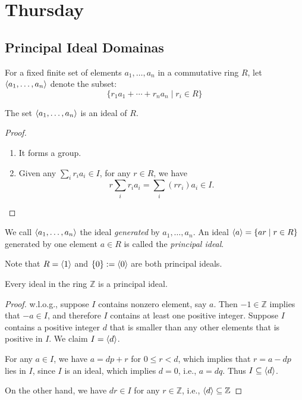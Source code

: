 \section{Thursday}



\subsection{Principal Ideal Domainas}
For a fixed finite set of elements $a_1,\dots,a_n$ in a commutative ring $R$, let $\langle a_1,\dots,a_n\rangle$ denote the subset:
\[
\{r_1a_1+\cdots+r_na_n\mid r_i\in R\}
\]
\begin{proposition}
The set $\langle a_1,\dots,a_n\rangle$ is an ideal of $R$.
\end{proposition}
\begin{proof}
\begin{enumerate}
\item
It forms a group.
\item
Given any $\sum_ir_ia_i\in I$, for any $r\in R$, we have
\[
r\sum_{i}r_ia_i=\sum_i(rr_i)a_i\in I.
\]
\end{enumerate}
\end{proof}
\begin{definition}
We call $\langle a_1,\dots,a_n\rangle$ the ideal \emph{generated} by $a_1,\dots,a_n$. An ideal $\langle a\rangle=\{ar\mid r\in R\}$ generated by one element $a\in R$ is called the \emph{principal ideal}.
\end{definition}
\begin{remark}
Note that $R=\langle 1\rangle$ and $\{0\}:=\langle 0\rangle$ are both principal ideals.
\end{remark}
\begin{theorem}
Every ideal in the ring $\mathbb{Z}$ is a principal ideal.
\end{theorem}
\begin{proof}
w.l.o.g., suppose $I$ contains nonzero element, say $a$. Then $-1\in\mathbb{Z}$ implies that $-a\in I$, and therefore $I$ contains at least one positive integer. Suppose $I$ contains a positive integer $d$ that is smaller than any other elements that is positive in $I$. We claim $I=\langle d\rangle$.

For any $a\in I$, we have $a=dp+r$ for $0\le r<d$, which implies that $r=a-dp$ lies in $I$, since $I$ is an ideal, which implies $d=0$, i.e., $a=dq$. Thus $I\subseteq\langle d\rangle$.

On the other hand, we have $dr\in I$ for any $r\in\mathbb{Z}$, i.e., $\langle d\rangle\subseteq\mathbb{Z}$
\end{proof}
